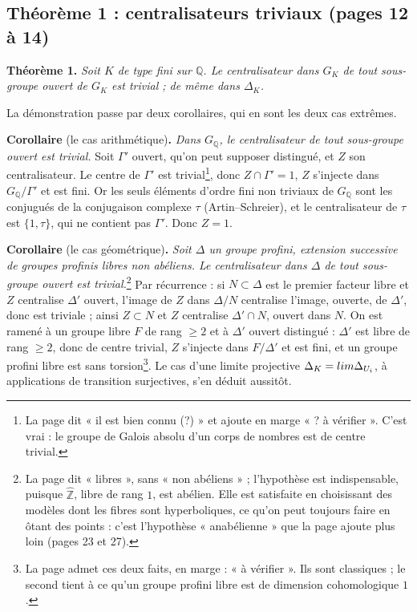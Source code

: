 \documentclass[11pt,a4paper]{article}
\begin{document}
\subsection*{Théorème 1 : centralisateurs triviaux (pages 12 à 14)}

\textbf{Théorème 1.} \emph{Soit $K$ de type fini sur $\mathbb{Q}$. Le
centralisateur dans $G_K$ de tout sous-groupe ouvert de $G_K$ est trivial ;
de même dans $\Delta_K$.}

La démonstration passe par deux corollaires, qui en sont les deux cas
extrêmes.

\textbf{Corollaire} (le cas arithmétique)\textbf{.} \emph{Dans
$G_{\mathbb{Q}}$, le centralisateur de tout sous-groupe ouvert est
trivial.} Soit $\Gamma'$ ouvert, qu'on peut supposer distingué, et $Z$ son
centralisateur. Le centre de $\Gamma'$ est trivial\footnote{La page dit « il
est bien connu (?) » et ajoute en marge « ? à vérifier ». C'est vrai : le
groupe de Galois absolu d'un corps de nombres est de centre trivial.}, donc
$Z \cap \Gamma' = 1$, $Z$ s'injecte dans $G_{\mathbb{Q}}/\Gamma'$ et est fini.
Or les seuls éléments d'ordre fini non triviaux de $G_{\mathbb{Q}}$ sont les
conjugués de la conjugaison complexe $\tau$ (Artin–Schreier), et le
centralisateur de $\tau$ est $\{1, \tau\}$, qui ne contient pas $\Gamma'$. Donc
$Z = 1$.

\textbf{Corollaire} (le cas géométrique)\textbf{.} \emph{Soit $\Delta$ un
groupe profini, extension successive de groupes profinis libres non
abéliens. Le centralisateur dans $\Delta$ de tout sous-groupe ouvert est
trivial.}\footnote{La page dit « libres », sans « non abéliens » ;
l'hypothèse est indispensable, puisque $\widehat{\mathbb{Z}}$, libre de rang
$1$, est abélien. Elle est satisfaite en choisissant des modèles dont les
fibres sont hyperboliques, ce qu'on peut toujours faire en ôtant des points :
c'est l'hypothèse « anabélienne » que la page ajoute plus loin (pages 23 et
27).} Par récurrence : si $N \subset \Delta$ est le premier facteur libre et
$Z$ centralise $\Delta'$ ouvert, l'image de $Z$ dans $\Delta/N$ centralise
l'image, ouverte, de $\Delta'$, donc est triviale ; ainsi $Z \subset N$ et $Z$
centralise $\Delta' \cap N$, ouvert dans $N$. On est ramené à un groupe libre
$F$ de rang $\ge 2$ et à $\Delta'$ ouvert distingué : $\Delta'$ est libre de
rang $\ge 2$, donc de centre trivial, $Z$ s'injecte dans $F/\Delta'$ et est
fini, et un groupe profini libre est sans torsion\footnote{La page admet ces
deux faits, en marge : « à vérifier ». Ils sont classiques ; le second tient à
ce qu'un groupe profini libre est de dimension cohomologique $1$.}. Le cas
d'une limite projective $\Delta_K = \varprojlim \Delta_{U_i}$, à applications
de transition surjectives, s'en déduit aussitôt.
\end{document}
